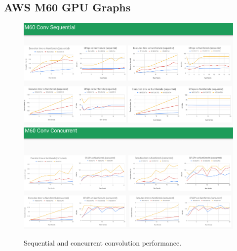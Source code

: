 \documentclass[sigconf]{acmart}
\begin{document}
\newpage~\newpage
\subsection{AWS M60 GPU Graphs}
\begin{figure}[htb]
  \centering
  \includegraphics[width=\textwidth]{img/m60-seq-conv}
  \includegraphics[width=\textwidth]{img/m60-conc-conv}
  \caption{Sequential and concurrent convolution performance.}
\end{figure}
\end{document}
